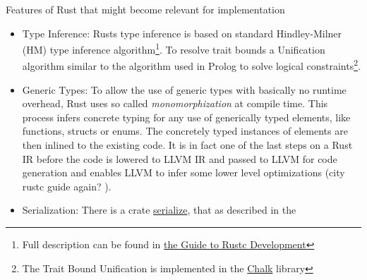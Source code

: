 Features of Rust that might become relevant for implementation
\begin{itemize}
    \item Type Inference: Rusts type inference is based on standard Hindley-Milner (HM) type inference algorithm\footnote{Full description can be found in \href{https://rustc-dev-guide.rust-lang.org/about-this-guide.html}{the Guide to Rustc Development}}. To resolve trait bounds a Unification algorithm similar to the algorithm used in Prolog to solve logical constraints\footnote{The Trait Bound Unification is implemented in the \href{https://rust-lang.github.io/chalk/book/}{Chalk} library}.
    \item Generic Types: To allow the use of generic types with basically no runtime overhead, Rust uses so called \textit{monomorphization} at compile time. This process infers concrete typing for any use of generically typed elements, like functions, structs or enums. The concretely typed instances of elements are then inlined to the existing code. It is in fact one of the last steps on a Rust IR before the code is lowered to LLVM IR and passed to LLVM for code generation and enables LLVM to infer some lower level optimizations (city rustc guide again? ).
    \item Serialization: There is a crate \href{https://doc.rust-lang.org/nightly/nightly-rustc/rustc_serialize/index.html}{serialize}, that as described in the 
\end{itemize}